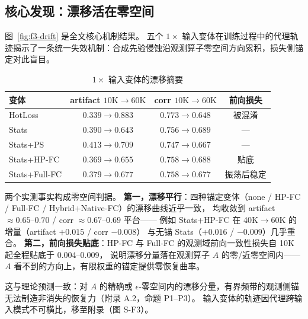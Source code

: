 \subsection{核心发现：漂移活在零空间}
\label{sec:exp-drift}

图~\ref{fig:f3-drift} 是全文核心机制结果。
五个 $1\times$ 输入变体在训练过程中的代理轨迹揭示了一条统一失效机制：合成先验侵蚀沿观测算子零空间方向累积，损失侧锚定对此盲目。

\begin{table}[t]
  \centering
  \caption{$1\times$ 输入变体的漂移摘要}
  \label{tab:drift-summary}
  \scriptsize
  \begin{tabular}{lccc}
    \toprule
    变体 & artifact $10\text{K}{\to}60\text{K}$ & corr $10\text{K}{\to}60\text{K}$ & 前向损失 \\
    \midrule
    HotLoss & $0.339{\to}0.883$ & $0.773{\to}0.648$ & 被混淆 \\
    Stats & $0.390{\to}0.643$ & $0.756{\to}0.689$ & --- \\
    Stats+PS & $0.413{\to}0.709$ & $0.747{\to}0.667$ & --- \\
    Stats+HP-FC & $0.369{\to}0.655$ & $0.758{\to}0.688$ & 贴底 \\
    Stats+Full-FC & $0.379{\to}0.677$ & $0.758{\to}0.677$ & 振荡后稳定 \\
    \bottomrule
  \end{tabular}
\end{table}

两个实测事实构成零空间判据。
\textbf{第一，漂移平行}：四种锚定变体（none / HP-FC / Full-FC / Hybrid+Native-FC）的漂移曲线近乎一致，
均收敛到 artifact $\approx 0.65$--$0.70$ / corr $\approx 0.67$--$0.69$ 平台——
例如 Stats+HP-FC 在 40K$\to$60K 的增量（artifact $+0.015$ / corr $-0.008$）
与无锚 Stats（$+0.016$ / $-0.009$）几乎重合。
\textbf{第二，前向损失贴底}：HP-FC 与 Full-FC 的观测域前向一致性损失自 10K 起全程贴底于 0.004--0.009，
说明漂移分量落在观测算子 $A$ 的零/近零空间内——$A$ 看不到的方向上，有限权重的锚定提供零恢复曲率。

这与理论预测一致：对 $A$ 的精确或 $\epsilon$-零空间内的漂移分量，有界频带的观测侧锚无法制造非消失的恢复力（附录 A.2，命题 P1--P3）。
 输入变体的轨迹因代理跨输入模式不可横比，移至附录（图 S-F3）。

